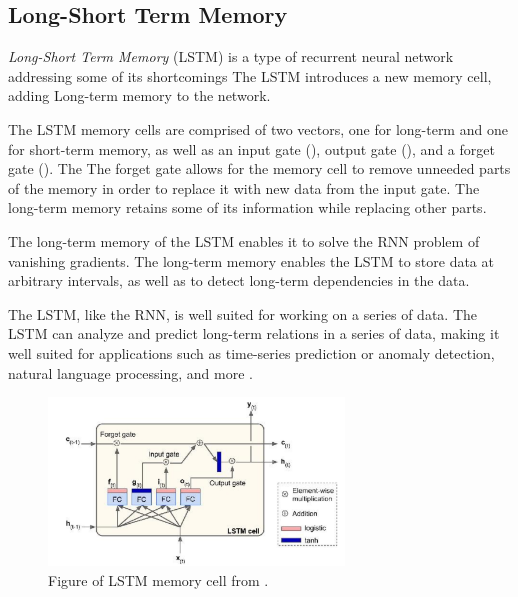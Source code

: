 \subsection{Long-Short Term Memory}
\label{section:BT:LSTM}

\textit{Long-Short Term Memory} (LSTM) is a type of recurrent neural network addressing some of its shortcomings
The LSTM introduces a new memory cell, adding Long-term memory to the network.

The LSTM memory cells are comprised of two vectors, one for long-term and one for short-term memory,
as well as an input gate (), output gate (),
and a forget gate (). The
The forget gate allows for the memory cell to remove unneeded parts of the memory in order to replace it with new data from the input gate.
The long-term memory retains some of its information while replacing other parts.

The long-term memory of the LSTM enables it to solve the RNN problem of vanishing gradients.
The long-term memory enables the LSTM to store data at arbitrary intervals, as well as to detect long-term dependencies in the data.

The LSTM, like the RNN, is well suited for working on a series of data.
The LSTM can analyze and predict long-term relations in a series of data, making it well suited for applications such as time-series prediction or anomaly detection,
natural language processing, and more
\cite[p.~492-493]{Geron2017}.

\begin{figure}[h!]
  \centering
  \includegraphics[width=0.7\textwidth]{./sections/BT/figures/lstm_cell_hands_on.png}
  \hfill
  \caption{Figure of LSTM memory cell from \cite[p.~492]{Geron2017}.}
  \label{fig:lstm-memory-cell}
\end{figure}

